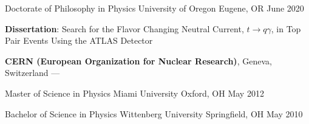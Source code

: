 
\begin{cventries}
  \cventry
    {Doctorate of Philosophy in Physics} %
    {University of Oregon} %
    {Eugene, OR} %
    {June 2020} %
    {
      \begin{cvitems} %
         \item {\textbf{Dissertation}: Search for the Flavor Changing Neutral Current, $t\rightarrow q \gamma$, in Top Pair Events Using the ATLAS Detector}
         \vspace{0.5mm}
         \item {\textbf{CERN (European Organization for Nuclear Research)}, Geneva, Switzerland --- }
      \end{cvitems}
    }

      \cventry
    {Master of Science in Physics} %
    {Miami University} %
    {Oxford, OH} %
    {May 2012} %
    {}
    
      \cventry
    {Bachelor of Science in Physics} %
    {Wittenberg University} %
    {Springfield, OH} %
    {May 2010} %
    {}
\end{cventries}
